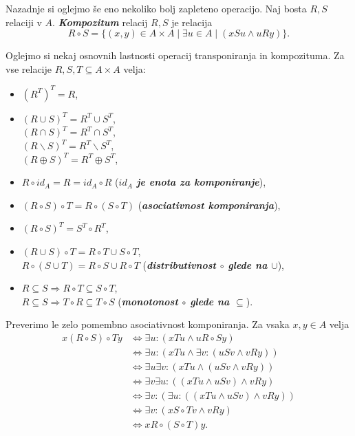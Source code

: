\documentclass[11pt]{book}
\def\definicija{\color{rdeca}\bf\em}
\theoremstyle{definition}
\theoremstyle{zgled}
\theoremstyle{odprtproblem}
\theoremstyle{domacanaloga}
\theoremstyle{izrek}
\begin{document}
Nazadnje si oglejmo še eno nekoliko bolj zapleteno operacijo. Naj bosta $R,S$ relaciji v $A$. {\definicija Kompozitum} relacij $R,S$ je relacija
\[
    R \circ S = \{ (x,y) \in A \times A \mid \exists u \in A \mid (x S u \land u R y)\}.
\]

Oglejmo si nekaj osnovnih lastnosti operacij transponiranja in kompozituma. Za vse relacije $R,S,T \subseteq A \times A$ velja:
\begin{itemize}
    \item $(R^T)^T = R$,
    \item $(R \cup S)^T = R^T \cup S^T$, \\ $(R \cap S)^T = R^T \cap S^T$, \\ $(R \backslash S)^T = R^T \backslash S^T$, \\ $(R \oplus S)^T = R^T \oplus S^T$,
    \item $R \circ id_A = R = id_A \circ R$ ({\definicija $id_A$ je enota za komponiranje}),
    \item $(R \circ S) \circ T = R \circ (S \circ T)$ ({\definicija asociativnost komponiranja}),
    \item $(R \circ S)^T = S^T \circ R^T$,
    \item $(R \cup S) \circ T = R \circ T \cup S \circ T$, \\ $R \circ (S \cup T) = R \circ S \cup R \circ T$ ({\definicija distributivnost $\circ$ glede na $\cup$}),
    \item $R \subseteq S \Rightarrow R \circ T \subseteq S \circ T$, \\ $R \subseteq S \Rightarrow T \circ R \subseteq T \circ S$ ({\definicija monotonost $\circ$ glede na $\subseteq$}).
\end{itemize}

Preverimo le zelo pomembno asociativnost komponiranja. Za vsaka $x,y \in A$ velja
\begin{align*}
    x (R \circ S) \circ T y &\Leftrightarrow \exists u \colon (xTu \land u R \circ S y) \\
    &\Leftrightarrow \exists u \colon (xTu \land \exists v \colon (uSv \land v Ry)) \\
    &\Leftrightarrow \exists u \exists v \colon (xTu \land (uSv \land vRy)) \\
    &\Leftrightarrow \exists v \exists u \colon ((xTu \land uSv) \land vRy) \\
    &\Leftrightarrow \exists v \colon (\exists u \colon ( (x T u \land uSv) \land vRy) ) \\
    &\Leftrightarrow \exists v \colon (x S \circ T v \land vRy) \\
    &\Leftrightarrow x R \circ (S \circ T) y.
\end{align*}
\end{document}
